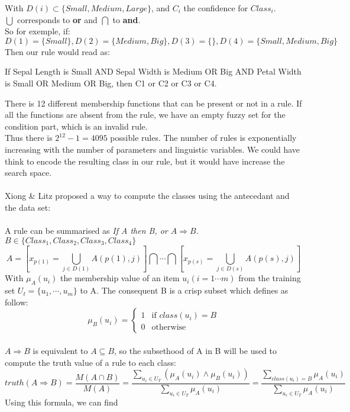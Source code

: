 \documentclass[a4paper,12pt]{article}
\begin{document}
With $D(i)\subset\{Small,Medium,Large\}$, and $C_i$ the confidence for $Class_i$. \\
$\bigcup$ corresponds to \textbf{or} and $\bigcap$ to \textbf{and}.\\
So for exemple, if:
\[D(1)=\{Small\},D(2)=\{Medium,Big\},D(3)=\{\},D(4)=\{Small,Medium,Big\}\]
Then our rule would read as:
\begin{center}If Sepal Length is Small AND Sepal Width is Medium OR Big AND Petal Width is Small OR Medium OR Big, then C1 or C2 or C3 or C4.\end{center} 
There is 12 different membership functions that can be present or not in a rule. If all the functions are absent from the rule, we have an empty fuzzy set for the condition part, which is an invalid rule.\\
Thus there is $2^{12}-1=4095$ possible rules. The number of rules is exponentially increasing with the number of parameters and linguistic variables. We could have think to encode the resulting class in our rule, but it would have increase the search space. \\ 
\\
Xiong \& Litz proposed a way to compute the classes using the antecedant and the data set: \\
\\
A rule can be summarised as \textit{If A then B, or $A\Rightarrow B$}.\\
$B\in \{Class_1,Class_2,Class_3,Class_4\}$\\
\[A=[x_{p(1)}=\bigcup_{j\in D(1)}A(p(1),j) ] \bigcap\cdots\bigcap[x_{p(s)}=\bigcup_{j\in D(s)}A(p(s),j)]\]
With $\mu_A(u_i)$ the membership value of an item $u_i(i=1\cdots m)$ from the training set $U_t=\{u_1,\cdots ,u_m\}$ to A.
The consequent B is a crisp subset which defines as follow:
\[\mu_B(u_i)=
\begin{cases}
	1 & \text{if $class(u_i)=B$}\\
	0 & \text{otherwise}
\end{cases}\]
\\
$A\Rightarrow B$ is equivalent to $A\subseteq B$, so the subsethood of A in B will be used to compute the truth value of a rule to each class:
\[
	truth(A\Rightarrow B)=
	\frac{M(A\cap B)}{M(A)}=
	\frac
		{\sum\limits_{u_i\in U_T}{(\mu_A(u_i)\land \mu_B(u_i))}}
		{\sum\limits_{u_i\in U_T}{\mu_A(u_i)}}=
	\frac
		{\sum\limits_{class(u_i)=B}{\mu_A(u_i)}}
		{\sum\limits_{u_i\in U_T}{\mu_A(u_i)}}
\]
Using this formula, we can find 
\end{document}
